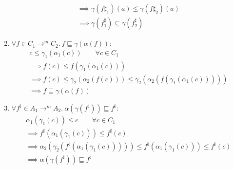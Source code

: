 \begin{exercise}
\begin{enumerate}[1.]
\begin{gather*}
            \implies \gamma(f\sharp_1)(a) \leq \gamma(f\sharp_2)(a) \\
            \implies \gamma(f^\sharp_1) \subseteq \gamma(f^\sharp_2)
        \end{gather*}
        \item $\forall f \in C_1 \to^m C_2.\ f \sqsubseteq \gamma(\alpha(f))$:
        \begin{gather*}
            c \leq \gamma_1 (\alpha_1 (c)) \qquad \forall c \in C_1 \\
            \implies f(c) \leq f(\gamma_1 (\alpha_1 (c))) \\
            \implies f(c) \leq \gamma_2(\alpha_2(f(c))) \leq \gamma_2(\alpha_2(f(\gamma_1 (\alpha_1 (c))))) \\
            \implies f \sqsubseteq \gamma(\alpha(f))
        \end{gather*}
        \item $\forall f^\sharp \in A_1 \to^m A_2.\ \alpha(\gamma(f^\sharp)) \sqsubseteq f^\sharp$:
        \begin{gather*}
            \alpha_1(\gamma_1(c)) \leq c \qquad \forall c \in C_1 \\
            \implies f^\sharp(\alpha_1(\gamma_1(c))) \leq f^\sharp(c) \\
            \implies \alpha_2(\gamma_2(f^\sharp(\alpha_1(\gamma_1(c))))) \leq f^\sharp(\alpha_1(\gamma_1(c))) \leq f^\sharp(c) \\
            \implies \alpha(\gamma(f^\sharp)) \sqsubseteq f^\sharp
        \end{gather*}
    \end{enumerate}
\end{exercise}
